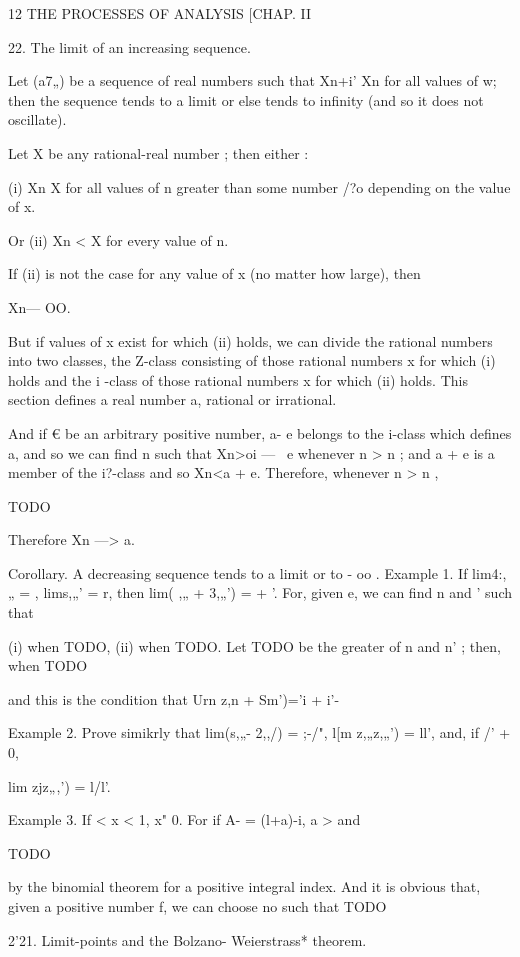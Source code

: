12 THE PROCESSES OF ANALYSIS [CHAP. II 

22. The limit of an increasing sequence. 

Let (a7„) be a sequence of real numbers such that Xn+i' Xn for all values 
of w; then the sequence tends to a limit or else tends to infinity (and so it does 
not oscillate). 

Let X be any rational-real number ; then either : 

(i) Xn   X for all values of n greater than some number /?o depending on 
the value of x. 

Or (ii) Xn < X for every value of n. 

If (ii) is not the case for any value of x (no matter how large), then 

Xn— OO. 

But if values of x exist for which (ii) holds, we can divide the rational 
numbers into two classes, the Z-class consisting of those rational numbers x 
for which (i) holds and the i -class of those rational numbers x for which (ii) 
holds. This section defines a real number a, rational or irrational. 

And if € be an arbitrary positive number, a- e belongs to the i-class 
which defines a, and so we can find n  such that Xn>oi — \ e whenever n > n  ; 
and a +  e is a member of the i?-class and so Xn<a +  e. Therefore, 
whenever n > n  , 

TODO

Therefore Xn —> a. 

Corollary. A decreasing sequence tends to a limit or to - oo . 
Example 1. If lim4:,„ =  , lims,„' = r, then lim( ,„ + 3,„') =   +  '. 
For, given e, we can find n and  ' such that 

(i) when TODO, (ii) when TODO. 
Let TODO be the greater of n and n' ; then, when TODO

and this is the condition that Urn  z,n + Sm')='i + i'- 

Example 2. Prove simikrly that lim(s,„- 2,,/) = ;-/", l[m z,„z,„') = ll', and, if /' + 0, 

lim zjz„,') = l/l'. 

Example 3. If < x < 1, x"   0. 
For if A- = (l+a)-i, a > and 

TODO

by the binomial theorem for a positive integral index. And it is obvious that, given a 
positive number f, we can choose no such that TODO

2'21. Limit-points and the Bolzano- Weierstrass* theorem. 

